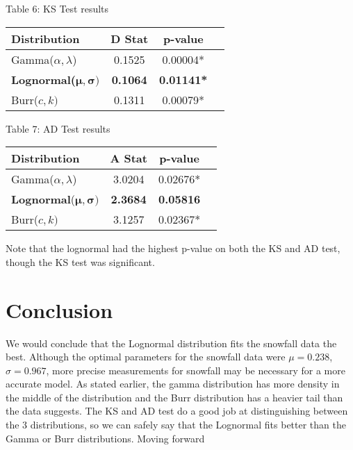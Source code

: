 \documentclass[letterpaper,12pt]{article}
\begin{document}
\begin{center}
\begin{table}[H]
Table 6: KS Test results \\
\begin{tabular}{ |p{1.25in}|c|c|c| } 
\hline
Distribution &  D Stat & p-value \\
\hline
Gamma($\alpha, \lambda$) & 0.1525 & 0.00004* \\ 
 \textbf{Lognormal($\boldsymbol{\mu},\boldsymbol{\sigma})$} & \textbf{0.1064} & \textbf{0.01141*} \\ 
 Burr($c,k)$ & 0.1311 & 0.00079* \\ 
\hline
\end{tabular}
\end{table}

\begin{table}[H]
Table 7: AD Test results \\
\begin{tabular}{ |p{1.25in}|c|c|c| } 
\hline
Distribution &  A Stat & p-value \\
\hline
Gamma($\alpha, \lambda$) & 3.0204 & 0.02676* \\ 
 \textbf{Lognormal}($\boldsymbol{\mu},\boldsymbol{\sigma})$ & \textbf{2.3684} & \textbf{0.05816} \\ 
 Burr($c,k)$ & 3.1257 & 0.02367* \\ 
\hline
\end{tabular}
\end{table}
\end{center}

Note that the lognormal had the highest p-value on both the KS and AD test, though the KS test was significant. 

\section{Conclusion}
We would conclude that the Lognormal distribution fits the snowfall data the best. Although the optimal parameters for the snowfall data were $\mu = 0.238$, $\sigma = 0.967$, more precise measurements for snowfall may be necessary for a more accurate model. As stated earlier, the gamma distribution has more density in the middle of the distribution and the Burr distribution has a heavier tail than the data suggests. The KS and AD test do a good job at distinguishing between the 3 distributions, so we can safely say that the Lognormal fits better than the Gamma or Burr distributions. Moving forward
\end{document}

